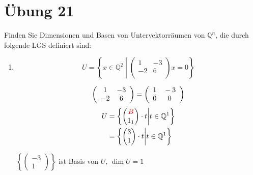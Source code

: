\documentclass{article}
\newcommand{\tikzmark}[1]{\tikz[overlay,remember picture]{ \node (#1) {};}}
\begin{document}
\newpage
\section*{Übung 21}

Finden Sie Dimensionen und Basen von Untervektorräumen von $\mathbb{Q}^n$, die durch folgende LGS definiert sind:
\begin{enumerate}[1)]
\item
  \[
    U = \left\{
      x \in \mathbb{Q}^2
      \middle|
    \begin{pmatrix}
      1  & -3 \\
      -2 & 6  \\
    \end{pmatrix}
    x = 0
    \right\}
  \]


  \begin{align*}
    \left(
    \begin{array}{cc}
      1  & -3 \\
      -2 & 6  \\      
    \end{array}
    \right)
    =
    \left(
    \begin{array}{cc}
      1 & \tikzmark{l1}-3 \\
      0 & 0\tikzmark{r1}  \\      
    \end{array}
    \right)    
  \end{align*}
  \begin{align*}
    U &= \left\{
      \begin{pmatrix}
        {\color{red} B} \\
        1_1 \\
      \end{pmatrix}
      \cdot t
      \middle|
      t \in \mathbb{Q}^1
    \right\} \\
    &= \left\{
      \begin{pmatrix}
        3 \\
        1 \\
      \end{pmatrix}
      \cdot t
      \middle|
      t \in \mathbb{Q}^1
    \right\} \\
  \end{align*}

  $\left\{\begin{pmatrix} -3 \\ 1 \end{pmatrix} \right\}$ ist Basis von $U$, $\dim U = 1$ 
  

\end{enumerate}
\end{document}
